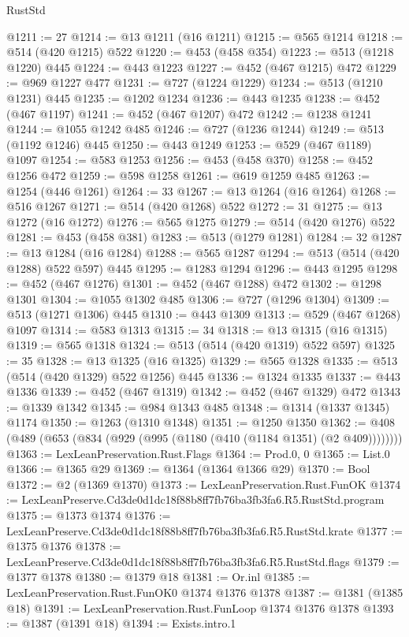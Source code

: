 \begin{lexlean}{RustStd}
\begin{coremodule}
@1211 := 27
@1214 := @13 @1211 (@16 @1211)
@1215 := @565 @1214
@1218 := @514 (@420 @1215) @522
@1220 := @453 (@458 @354)
@1223 := @513 (@1218 @1220) @445
@1224 := @443 @1223
@1227 := @452 (@467 @1215) @472
@1229 := @969 @1227 @477
@1231 := @727 (@1224 @1229)
@1234 := @513 (@1210 @1231) @445
@1235 := @1202 @1234
@1236 := @443 @1235
@1238 := @452 (@467 @1197)
@1241 := @452 (@467 @1207) @472
@1242 := @1238 @1241
@1244 := @1055 @1242 @485
@1246 := @727 (@1236 @1244)
@1249 := @513 (@1192 @1246) @445
@1250 := @443 @1249
@1253 := @529 (@467 @1189) @1097
@1254 := @583 @1253
@1256 := @453 (@458 @370)
@1258 := @452 @1256 @472
@1259 := @598 @1258
@1261 := @619 @1259 @485
@1263 := @1254 (@446 @1261)
@1264 := 33
@1267 := @13 @1264 (@16 @1264)
@1268 := @516 @1267
@1271 := @514 (@420 @1268) @522
@1272 := 31
@1275 := @13 @1272 (@16 @1272)
@1276 := @565 @1275
@1279 := @514 (@420 @1276) @522
@1281 := @453 (@458 @381)
@1283 := @513 (@1279 @1281)
@1284 := 32
@1287 := @13 @1284 (@16 @1284)
@1288 := @565 @1287
@1294 := @513 (@514 (@420 @1288) @522 @597) @445
@1295 := @1283 @1294
@1296 := @443 @1295
@1298 := @452 (@467 @1276)
@1301 := @452 (@467 @1288) @472
@1302 := @1298 @1301
@1304 := @1055 @1302 @485
@1306 := @727 (@1296 @1304)
@1309 := @513 (@1271 @1306) @445
@1310 := @443 @1309
@1313 := @529 (@467 @1268) @1097
@1314 := @583 @1313
@1315 := 34
@1318 := @13 @1315 (@16 @1315)
@1319 := @565 @1318
@1324 := @513 (@514 (@420 @1319) @522 @597)
@1325 := 35
@1328 := @13 @1325 (@16 @1325)
@1329 := @565 @1328
@1335 := @513 (@514 (@420 @1329) @522 @1256) @445
@1336 := @1324 @1335
@1337 := @443 @1336
@1339 := @452 (@467 @1319)
@1342 := @452 (@467 @1329) @472
@1343 := @1339 @1342
@1345 := @984 @1343 @485
@1348 := @1314 (@1337 @1345) @1174
@1350 := @1263 (@1310 @1348)
@1351 := @1250 @1350
@1362 := @408 (@489 (@653 (@834 (@929 (@995 (@1180 (@410 (@1184 @1351) (@2 @409))))))))
@1363 := LexLeanPreservation.Rust.Flags
@1364 := Prod.{0, 0}
@1365 := List.{0}
@1366 := @1365 @29
@1369 := @1364 (@1364 @1366 @29)
@1370 := Bool
@1372 := @2 (@1369 @1370)
@1373 := LexLeanPreservation.Rust.FunOK
@1374 := LexLeanPreserve.Cd3de0d1dc18f88b8ff7fb76ba3fb3fa6.R5.RustStd.program
@1375 := @1373 @1374
@1376 := LexLeanPreserve.Cd3de0d1dc18f88b8ff7fb76ba3fb3fa6.R5.RustStd.krate
@1377 := @1375 @1376
@1378 := LexLeanPreserve.Cd3de0d1dc18f88b8ff7fb76ba3fb3fa6.R5.RustStd.flags
@1379 := @1377 @1378
@1380 := @1379 @18
@1381 := Or.inl
@1385 := LexLeanPreservation.Rust.FunOK0 @1374 @1376 @1378
@1387 := @1381 (@1385 @18)
@1391 := LexLeanPreservation.Rust.FunLoop @1374 @1376 @1378
@1393 := @1387 (@1391 @18)
@1394 := Exists.intro.{1}

\end{coremodule}
\end{lexlean}

